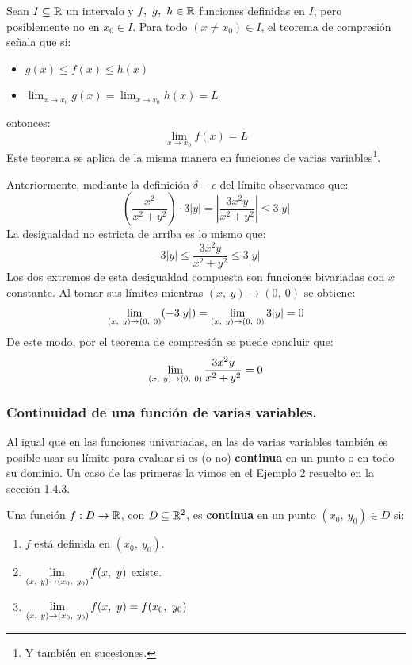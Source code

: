 \documentclass[12pt]{article}
\begin{document}
Sean $I \subseteq \mathbb{R}$ un intervalo y $f, \ g, \ h \in \mathbb{R}$ funciones definidas en $I$, pero posiblemente no en $x_{0} \in I$. Para todo $(x \neq x_{0}) \in I$, el teorema de compresión señala que si:

\begin{itemize}
\item $g(x) \leq f(x) \leq h(x)$
\item $\displaystyle \lim_{x \to x_{0}} g(x) = \lim_{x \to x_{0}} h(x) = L$
\end{itemize}

entonces:
\[
  \lim_{x \to x_{0}} f(x) = L
\]
Este teorema se aplica de la misma manera en funciones de varias variables\footnote{Y también en sucesiones.}.

Anteriormente, mediante la definición $\delta-\epsilon$ del límite observamos que:
\[
  \left(\frac{x^{2}}{x^{2} + y^{2}}\right) \cdot 3|y| = \left|\frac{3x^{2}y}{x^{2} + y^{2}}\right| \leq 3|y|
\]
La desigualdad no estricta de arriba es lo mismo que:
\[
  -3|y| \leq \frac{3x^{2}y}{x^{2} + y^{2}} \leq 3|y|
\]
Los dos extremos de esta desigualdad compuesta son funciones bivariadas con $x$ constante. Al tomar sus límites mientras $(x, \ y) \to (0, \ 0)$ se obtiene:
\[
 \lim_{(x, \ y) \to (0, \ 0)} (-3|y|) = \lim_{(x, \ y) \to (0, \ 0)} 3|y| = 0
\]
De este modo, por el teorema de compresión se puede concluir que:
\[
  \lim_{(x, \ y) \to (0, \ 0)} \frac{3x^{2}y}{x^{2} + y^{2}} = 0
\]

\subsubsection{Continuidad de una función de varias variables.}

Al igual que en las funciones univariadas, en las de varias variables también es posible usar su límite para evaluar si es (o no) \textbf{continua} en un punto o en todo su dominio. Un caso de las primeras la vimos en el Ejemplo 2 resuelto en la sección 1.4.3.

Una función $f:D \to \mathbb{R}$, con $D \subseteq \mathbb{R}^{2}$, es \textbf{continua} en un punto $(x_{0}, \ y_{0}) \in D$ si:

\begin{enumerate}
\item $f$ está definida en $(x_{0}, \ y_{0})$.

\item $\displaystyle \lim_{(x, \ y) \to (x_{0}, \ y_{0})} f(x, \ y)$ existe.

\item $\displaystyle \lim_{(x, \ y) \to (x_{0}, \ y_{0})} f(x, \ y) = f(x_{0}, \ y_{0})$
\end{enumerate}
\end{document}
